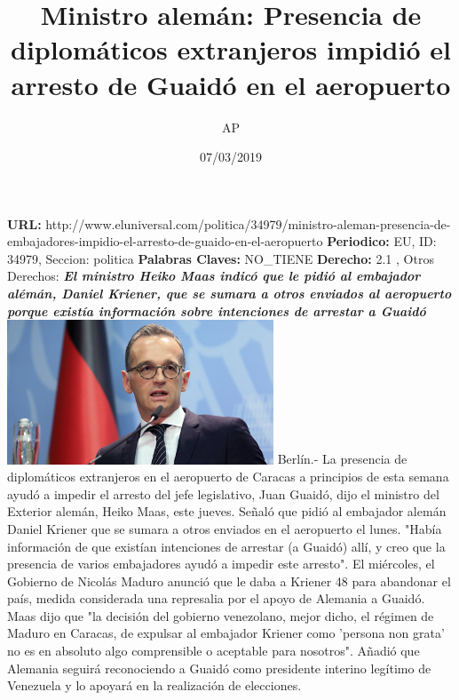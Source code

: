 \documentclass{article}%
\title{\textbf{Ministro alemán: Presencia de diplomáticos extranjeros impidió el arresto de Guaidó en el aeropuerto}}%
\author{AP}%
\date{07/03/2019}%
\begin{document}
%
\normalsize%
\maketitle%
\textbf{URL: }%
http://www.eluniversal.com/politica/34979/ministro{-}aleman{-}presencia{-}de{-}embajadores{-}impidio{-}el{-}arresto{-}de{-}guaido{-}en{-}el{-}aeropuerto\newline%
%
\textbf{Periodico: }%
EU, %
ID: %
34979, %
Seccion: %
politica\newline%
%
\textbf{Palabras Claves: }%
NO\_TIENE\newline%
%
\textbf{Derecho: }%
2.1%
, Otros Derechos: %
\newline%
%
\textbf{\textit{El ministro Heiko Maas indicó que le pidió al embajador alémán, Daniel Kriener, que se sumara a otros enviados al aeropuerto porque existía información sobre intenciones de arrestar a Guaidó}}%
\newline%
\newline%
%
\includegraphics[width=300px]{EU_34979.jpg}%
\newline%
%
Berlín.{-} La presencia de diplomáticos extranjeros en el aeropuerto de Caracas a principios de esta semana ayudó a impedir el arresto del jefe legislativo, Juan Guaidó, dijo el ministro del Exterior alemán, Heiko Maas, este jueves.%
\newline%
%
Señaló que pidió al embajador alemán Daniel Kriener que se sumara a otros enviados en el aeropuerto el lunes. "Había información de que existían intenciones de arrestar (a Guaidó) allí, y creo que la presencia de varios embajadores ayudó a impedir este arresto".%
\newline%
%
El miércoles, el Gobierno de Nicolás Maduro anunció que le daba a Kriener 48 para abandonar el país, medida considerada una represalia por el apoyo de Alemania a Guaidó.%
\newline%
%
Maas dijo que "la decisión del gobierno venezolano, mejor dicho, el régimen de Maduro en Caracas, de expulsar al embajador Kriener como 'persona non grata' no es en absoluto algo comprensible o aceptable para nosotros".%
\newline%
%
Añadió que Alemania seguirá reconociendo a Guaidó como presidente interino legítimo de Venezuela y lo apoyará en la realización de elecciones.%
\newline%
%
\end{document}
